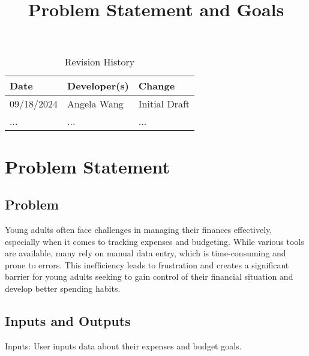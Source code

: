 \documentclass{article}
\title{Problem Statement and Goals\\\progname}
\author{\authname}
\date{}
\begin{document}
\maketitle

\begin{table}[hp]
\caption{Revision History} \label{TblRevisionHistory}
\begin{tabularx}{\textwidth}{llX}
\toprule
\textbf{Date} & \textbf{Developer(s)} & \textbf{Change}\\
\midrule
09/18/2024 & Angela Wang & Initial Draft\\
... & ... & ...\\
\bottomrule
\end{tabularx}
\end{table}

\section{Problem Statement}



\subsection{Problem}

Young adults often face challenges in managing their finances effectively,
especially when it comes to tracking expenses and budgeting. While various tools are available, many rely on manual data entry, which is time-consuming and prone to errors. This inefficiency leads to frustration and creates a significant barrier for young adults seeking to gain control of their financial situation and develop better spending habits.


\subsection{Inputs and Outputs}


Inputs: User inputs data about their expenses and budget goals.
\end{document}
